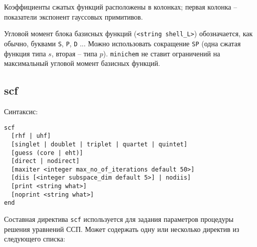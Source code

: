 \documentclass[a4paper, 12pt]{article}
\begin{document}
Коэффициенты сжатых функций расположены в колонках; первая колонка -- показатели экспонент гауссовых примитивов.

Угловой момент блока базисных функций (\texttt{<string shell\_L>}) обозначается, как обычно, буквами \texttt{S}, \texttt{P}, \texttt{D} ... Можно использовать сокращение \texttt{SP} (одна сжатая функция типа $s$, вторая -- типа $p$). \texttt{minichem} не ставит ограничений на максимальный угловой момент базисных функций.

\subsection{scf}

Синтаксис:

\begin{lstlisting}
scf
  [rhf | uhf]
  [singlet | doublet | triplet | quartet | quintet]
  [guess (core | eht)]
  [direct | nodirect]
  [maxiter <integer max_no_of_iterations default 50>]
  [diis [<integer subspace_dim default 5>] | nodiis]
  [print <string what>]
  [noprint <string what>]
end
\end{lstlisting}

Составная директива \texttt{scf} используется для задания параметров процедуры решения уравнений ССП. Может содержать одну или несколько директив из следующего списка:
\end{document}
